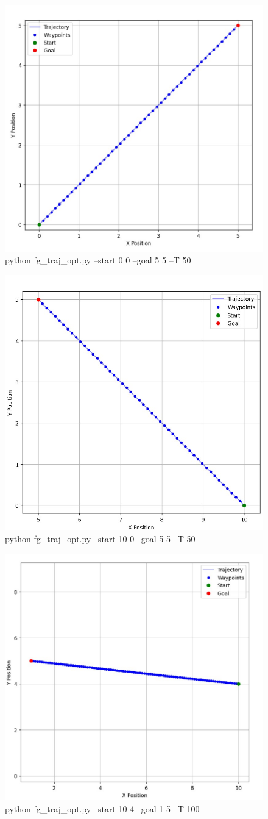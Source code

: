 \documentclass{article}
\begin{document}
\begin{figure} [H]
    \centering
    \includegraphics[width=0.5\linewidth]{latex_media/fg_traj_opt_1.jpg}
    \caption{python fg\_traj\_opt.py --start 0 0 --goal 5 5 --T 50}
    
\end{figure}

\begin{figure} [H]
    \centering
    \includegraphics[width=0.5\linewidth]{latex_media/fg_traj_opt_2.jpg}
    \caption{python fg\_traj\_opt.py --start 10 0 --goal 5 5 --T 50}
    
\end{figure}

\begin{figure} [H]
    \centering
    \includegraphics[width=0.5\linewidth]{latex_media/fg_traj_opt_3.jpg}
    \caption{python fg\_traj\_opt.py --start 10 4 --goal 1 5 --T 100}
    
\end{figure}
\end{document}
